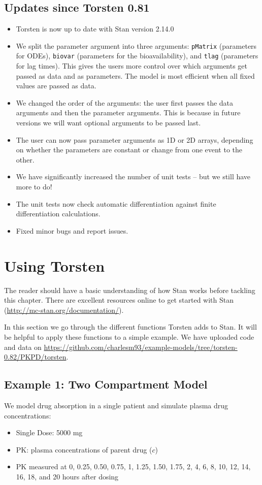 \documentclass[11pt]{amsart}
\let\oldsection\section
\renewcommand\section{\clearpage\oldsection}
\begin{document}
\subsection{Updates since Torsten 0.81}
\begin{itemize}
  \item Torsten is now up to date with Stan version 2.14.0
  \item We split the parameter argument into three arguments: \texttt{pMatrix} (parameters for ODEs), \texttt{biovar} (parameters for the bioavailability), and \texttt{tlag} (parameters for lag times). This gives the users more control over which arguments get passed as data and as parameters. The model is most efficient when all fixed values are passed as data.
  \item We changed the order of the arguments: the user first passes the data arguments and then the parameter arguments. This is because in future versions we will want optional arguments to be passed last.
  \item The user can now pass parameter arguments as 1D or 2D arrays, depending on whether the parameters are constant or change from one event to the other.
  \item We have significantly increased the number of unit tests -- but we still have more to do!
  \item The unit tests now check automatic differentiation against finite differentiation calculations.
  \item Fixed minor bugs and report issues.
\end{itemize}
 


\section{Using Torsten}

The reader should have a basic understanding of how Stan works before tackling this chapter. There are excellent resources online to get started with Stan (\url{http://mc-stan.org/documentation/}). 

In this section we go through the different functions Torsten adds to Stan. It will be helpful to apply these functions to a simple example. We have uploaded code and data on \url{https://github.com/charlesm93/example-models/tree/torsten-0.82/PKPD/torsten}.

\subsection{Example 1: Two Compartment Model}
We model drug absorption in a single patient and simulate plasma drug concentrations:
\begin{itemize}
  \item Single Dose: 5000 mg
  \item PK: plasma concentrations of parent drug ($c$)
  \item PK measured at 0, 0.25, 0.50, 0.75, 1, 1.25, 1.50, 1.75, 2, 4, 6, 8, 10, 12, 14, 16, 18, and 20 hours after dosing
\end{itemize}
\end{document}
